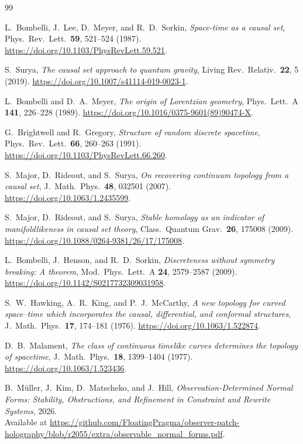 \documentclass[11pt]{article}
\theoremstyle{remark}
\theoremstyle{plain}
\begin{document}
\begin{thebibliography}{99}

L.~Bombelli, J.~Lee, D.~Meyer, and R.~D.~Sorkin,
\emph{Space-time as a causal set},
Phys.\ Rev.\ Lett.\ \textbf{59}, 521--524 (1987).
\url{https://doi.org/10.1103/PhysRevLett.59.521}.

S.~Surya,
\emph{The causal set approach to quantum gravity},
Living Rev.\ Relativ.\ \textbf{22}, 5 (2019).
\url{https://doi.org/10.1007/s41114-019-0023-1}.

L.~Bombelli and D.~A.~Meyer,
\emph{The origin of Lorentzian geometry},
Phys.\ Lett.\ A \textbf{141}, 226--228 (1989).
\url{https://doi.org/10.1016/0375-9601(89)90474-X}.

G.~Brightwell and R.~Gregory,
\emph{Structure of random discrete spacetime},
Phys.\ Rev.\ Lett.\ \textbf{66}, 260--263 (1991).
\url{https://doi.org/10.1103/PhysRevLett.66.260}.

S.~Major, D.~Rideout, and S.~Surya,
\emph{On recovering continuum topology from a causal set},
J.\ Math.\ Phys.\ \textbf{48}, 032501 (2007).
\url{https://doi.org/10.1063/1.2435599}.

S.~Major, D.~Rideout, and S.~Surya,
\emph{Stable homology as an indicator of manifoldlikeness in causal set theory},
Class.\ Quantum Grav.\ \textbf{26}, 175008 (2009).
\url{https://doi.org/10.1088/0264-9381/26/17/175008}.

L.~Bombelli, J.~Henson, and R.~D.~Sorkin,
\emph{Discreteness without symmetry breaking: A theorem},
Mod.\ Phys.\ Lett.\ A \textbf{24}, 2579--2587 (2009).
\url{https://doi.org/10.1142/S0217732309031958}.

S.~W.~Hawking, A.~R.~King, and P.~J.~McCarthy,
\emph{A new topology for curved space--time which incorporates the causal,
differential, and conformal structures},
J.\ Math.\ Phys.\ \textbf{17}, 174--181 (1976).
\url{https://doi.org/10.1063/1.522874}.

D.~B.~Malament,
\emph{The class of continuous timelike curves determines the topology of spacetime},
J.\ Math.\ Phys.\ \textbf{18}, 1399--1404 (1977).
\url{https://doi.org/10.1063/1.523436}.

B.\ M\"uller, J.\ Kim, D.\ Matscheko, and J.\ Hill,
\emph{Observation-Determined Normal Forms: Stability, Obstructions, and Refinement in Constraint
and Rewrite Systems},
2026.\\
Available at \url{https://github.com/FloatingPragma/observer-patch-holography/blob/r2055/extra/observable_normal_forms.pdf}.


\end{thebibliography}
\end{document}
